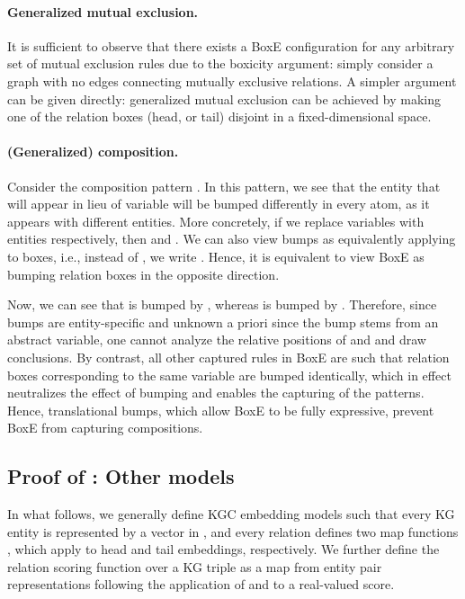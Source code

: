 \documentclass{article}
\begin{document}
\paragraph{Generalized mutual exclusion.} It is sufficient to observe that there exists a BoxE configuration for any arbitrary set of mutual exclusion rules due to the boxicity argument: simply consider a graph  with no edges connecting mutually exclusive relations. A simpler argument can be given directly: generalized mutual exclusion can be achieved by making one of the relation boxes (head, or tail) disjoint in a fixed-dimensional space. 

\paragraph{(Generalized) composition.} Consider the composition pattern . In this pattern, we see that the entity that will appear in lieu of variable  will be bumped differently in every atom, as it appears with different entities. More concretely, if we replace variables  with entities  respectively, then  and . We can also view bumps as equivalently applying to boxes, i.e., instead of , we write . Hence, it is equivalent to view BoxE as bumping relation boxes in the opposite direction. 

Now, we can see that   is bumped by , whereas  is bumped by . Therefore, since bumps are entity-specific and unknown a priori since the bump stems from an abstract variable, one cannot analyze the relative positions of  and  and draw conclusions. By contrast, all other captured rules in BoxE are such that relation boxes corresponding to the same variable are bumped identically, which in effect neutralizes the effect of bumping and enables the capturing of the patterns. Hence, translational bumps, which allow BoxE to be fully expressive, prevent BoxE from capturing compositions.

\subsection{Proof of : Other models}

In what follows, we generally define KGC embedding models such that every KG entity is represented by a vector in , and every relation defines two map functions , which apply to head and tail embeddings, respectively. We further define the relation scoring function over a KG triple  as a map from entity pair representations following the application of  and  to a real-valued score. 
\end{document}
